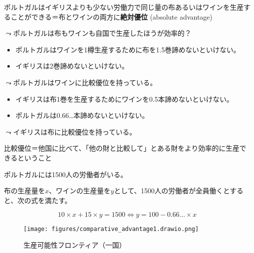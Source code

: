 \documentclass[
  xelatex,
  ja=standard]{bxjsarticle}
\providecommand{\tightlist}{%
  \setlength{\itemsep}{0pt}\setlength{\parskip}{0pt}}\usepackage{longtable,booktabs,array}
\begin{document}
ポルトガルはイギリスよりも少ない労働力で同じ量の布あるいはワインを生産することができる＝布とワインの両方に\textbf{絶対優位}
(absolute advantage)

\(\leadsto\)ポルトガルは布もワインも自国で生産したほうが効率的？

\begin{itemize}
\tightlist
\item
  ポルトガルはワインを1樽生産するために布を1.5巻諦めないといけない。
\item
  イギリスは2巻諦めないといけない。
\end{itemize}

\(\leadsto\)ポルトガルはワインに比較優位を持っている。

\begin{itemize}
\tightlist
\item
  イギリスは布1巻を生産するためにワインを0.5本諦めないといけない。
\item
  ポルトガルは0.66\ldots 本諦めないといけない。
\end{itemize}

\(\leadsto\)イギリスは布に比較優位を持っている。

比較優位＝他国に比べて、「他の財と比較して」とある財をより効率的に生産できるということ

\begin{tcolorbox}[enhanced jigsaw, toprule=.15mm, leftrule=.75mm, coltitle=black, opacityback=0, colback=white, title=\textcolor{quarto-callout-tip-color}{\faLightbulb}\hspace{0.5em}{イギリスとポルトガルの貿易'}, rightrule=.15mm, bottomrule=.15mm, colbacktitle=quarto-callout-tip-color!10!white, opacitybacktitle=0.6, titlerule=0mm, colframe=quarto-callout-tip-color-frame, bottomtitle=1mm, toptitle=1mm, arc=.35mm, left=2mm, breakable]

ポルトガルには1500人の労働者がいる。

\end{tcolorbox}

布の生産量を\(x\)、ワインの生産量を\(y\)として、1500人の労働者が全員働くとすると、次の式を満たす。

\[
10 \times x + 15 \times y = 1500
\Leftrightarrow y = 100 - 0.66 \dots \times x
\]

\begin{figure}[htpb]

{\centering \texttt{[image: figures/comparative\_advantage1.drawio.png]}

}

\caption{生産可能性フロンティア（一国）}

\end{figure}
\end{document}
